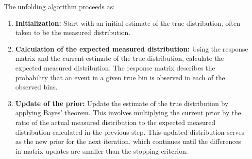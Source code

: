 

        The unfolding algorithm proceeds as: 
        \begin{enumerate}
            \item \textbf{Initialization:} Start with an initial estimate of the true distribution, often taken to be the measured distribution. 
        
            \item \textbf{Calculation of the expected measured distribution:} Using the response matrix and the current estimate of the true distribution, calculate the expected measured distribution. The response matrix describes the probability that an event in a given true bin is observed in each of the observed bins.
        
            \item \textbf{Update of the prior:} Update the estimate of the true distribution by applying Bayes' theorem. This involves multiplying the current prior by the ratio of the actual measured distribution to the expected measured distribution calculated in the previous step. This updated distribution serves as the new prior for the next iteration, which continues until the differences in matrix updates are smaller than the stopping criterion. 

        
        \end{enumerate}

        
